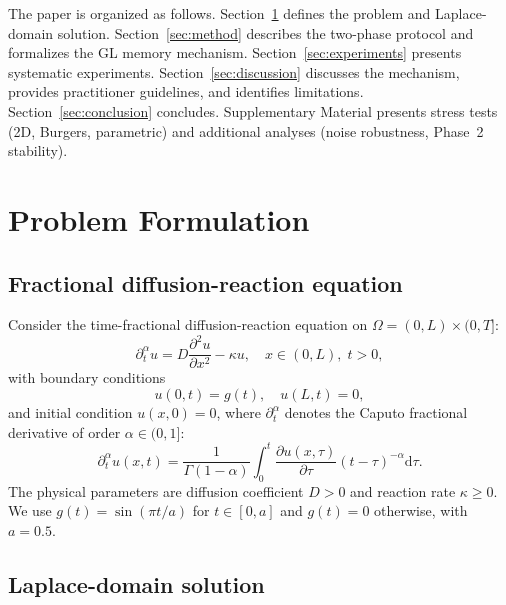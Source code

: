 \documentclass[preprint,12pt]{elsarticle}
\newcommand{\diff}{\mathrm{d}}
\begin{document}
The paper is organized as follows. Section~\ref{sec:problem} defines the problem and Laplace-domain solution. Section~\ref{sec:method} describes the two-phase protocol and formalizes the GL memory mechanism. Section~\ref{sec:experiments} presents systematic experiments. Section~\ref{sec:discussion} discusses the mechanism, provides practitioner guidelines, and identifies limitations. Section~\ref{sec:conclusion} concludes. Supplementary Material presents stress tests (2D, Burgers, parametric) and additional analyses (noise robustness, Phase~2 stability).

\section{Problem Formulation}
\label{sec:problem}

\subsection{Fractional diffusion-reaction equation}

Consider the time-fractional diffusion-reaction equation on $\Omega = (0, L) \times (0, T]$:
\begin{equation}
\label{eq:fdr}
\partial_t^\alpha u = D \frac{\partial^2 u}{\partial x^2} - \kappa u, \quad x \in (0, L),\; t > 0,
\end{equation}
with boundary conditions \cite{podlubny1999fractional}
\begin{equation}
u(0, t) = g(t), \quad u(L, t) = 0,
\end{equation}
and initial condition $u(x, 0) = 0$, where $\partial_t^\alpha$ denotes the Caputo fractional derivative of order $\alpha \in (0, 1]$:
\begin{equation}
\partial_t^\alpha u(x,t) = \frac{1}{\Gamma(1-\alpha)} \int_0^t \frac{\partial u(x,\tau)}{\partial \tau} (t - \tau)^{-\alpha} \diff\tau.
\end{equation}
The physical parameters are diffusion coefficient $D > 0$ and reaction rate $\kappa \geq 0$. We use $g(t) = \sin(\pi t / a)$ for $t \in [0, a]$ and $g(t) = 0$ otherwise, with $a = 0.5$.

\subsection{Laplace-domain solution}
\label{sec:laplace}
\end{document}
